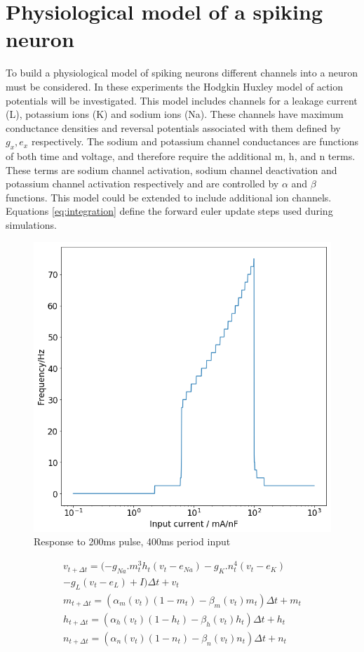 \documentclass[twoside,twocolumn]{article}
\begin{document}
\section{Physiological model of a spiking neuron}
To build a physiological model of spiking neurons different channels into a neuron must be considered. In these experiments the Hodgkin Huxley model of action potentials will be investigated. This model includes channels for a leakage current (L), potassium ions (K) and sodium ions (Na). These channels have maximum conductance densities and reversal potentials associated with them defined by $g_x,e_x$ respectively. The sodium and potassium channel conductances are functions of both time and voltage, and therefore require the additional m, h,  and n terms. These terms are sodium channel activation, sodium channel deactivation and potassium channel activation respectively and are controlled by $\alpha$ and $\beta$ functions. This model could be extended to include additional ion channels. Equations \ref{eq:integration} define the forward euler update steps used during simulations.
\begin{figure}[h]
  \centering
    \includegraphics[width=0.85\linewidth]{fl}
  \caption{Response to 200ms pulse, 400ms period input}
  \label{fig:2aw}
\end{figure}

\begin{equation}
\begin{split}
v_{t+\Delta t} = ( -g_{Na}.m_t^3 h_t(v_t-e_{Na})  -g_K.n_t^4(v_t-e_K)  \\ -g_L(v_t-e_L) + I)\Delta t + v_t \\
m_{t+\Delta t} =  ( \alpha_m(v_t)(1-m_t) - \beta_m(v_t)m_t ) \Delta t + m_t \\
   h_{t+\Delta t}  =  ( \alpha_h(v_t)(1-h_t) - \beta_h(v_t)h_t ) \Delta t + h_t \\
    n_{t+\Delta t}  =  ( \alpha_n(v_t)(1-n_t) - \beta_n(v_t)n_t )\Delta t + n_t \\
\end{split}
\label{eq:integration}
\end{equation}
\end{document}
